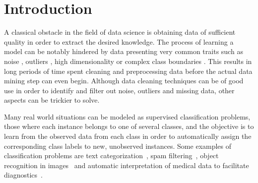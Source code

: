 \section{Introduction}\label{p6sec.intro}

% 
% 
% 

A classical obstacle in the field of data science is obtaining data of sufficient quality in order to extract the desired knowledge. The process of learning a model can be notably hindered by data presenting very common traits such as noise , outliers , high dimensionality  or complex class boundaries . This results in long periods of time spent cleaning and preprocessing data  before the actual data mining step can even begin.
Although data cleaning techniques can be of good use in order to identify and filter out noise, outliers and missing data, other aspects can be trickier to solve.

Many real world situations can be modeled as supervised classification problems, those where each instance belongs to one of several classes, and the objective is to learn from the observed data from each class in order to automatically assign the corresponding class labels to new, unobserved instances. Some examples of classification problems are text categorization~, spam filtering~, object recognition in images~ and automatic interpretation of medical data to facilitate diagnostics~. 


